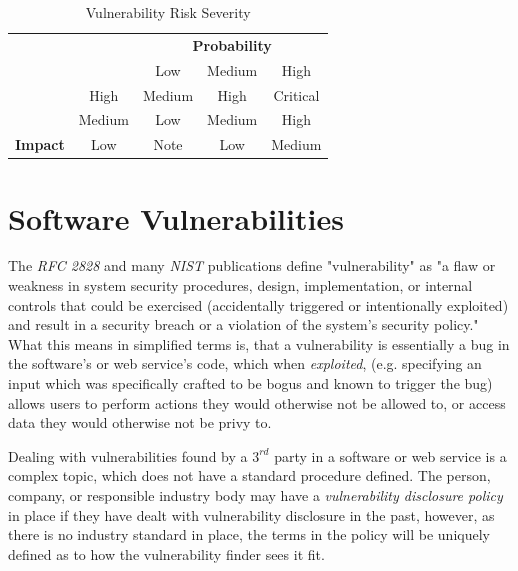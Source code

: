 \documentclass[a4paper,12pt]{article}
\begin{document}
	\begin{table}[!htbp]
		\centering
		\begin{tabular}{ccccc}
			\multicolumn{1}{l}{} & \multicolumn{1}{l}{} & \multicolumn{3}{c}{{\bf Probability}} \\
			\multicolumn{1}{l}{} &  & \cellcolor[HTML]{EFEFEF}Low & \cellcolor[HTML]{C0C0C0}Medium & \cellcolor[HTML]{9B9B9B}High \\
			& \cellcolor[HTML]{9B9B9B}High & \cellcolor[HTML]{F8A102}Medium & \cellcolor[HTML]{FE0000}High & \cellcolor[HTML]{FFCCC9}Critical \\
			& \cellcolor[HTML]{C0C0C0}Medium & \cellcolor[HTML]{FCFF2F}Low & \cellcolor[HTML]{F8A102}Medium & \cellcolor[HTML]{FE0000}High \\
			\multirow{-3}{*}{{\bf Impact}} & \cellcolor[HTML]{EFEFEF}Low & \cellcolor[HTML]{34FF34}Note & \cellcolor[HTML]{FCFF2F}Low & \cellcolor[HTML]{F8A102}Medium
		\end{tabular}
		\caption{Vulnerability Risk Severity}
		\label{vulnrisksever}
	\end{table}

\newpage
\section{Software Vulnerabilities}
	
	The \textit{RFC 2828} and many \textit{NIST} publications define "vulnerability" as "a flaw or weakness in system security procedures, design, implementation, or internal controls that could be exercised (accidentally triggered or intentionally exploited) and result in a security breach or a violation of the system's security policy."\cite{rfc2828,nist80030} What this means in simplified terms is, that a vulnerability is essentially a bug in the software's or web service's code, which when \textit{exploited}, (e.g. specifying an input which was specifically crafted to be bogus and known to trigger the bug) allows users to perform actions they would otherwise not be allowed to, or access data they would otherwise not be privy to.
	
	Dealing with vulnerabilities found by a $3^{rd}$ party in a software or web service is a complex topic, which does not have a standard procedure defined. The person, company, or responsible industry body may have a \textit{vulnerability disclosure policy} in place if they have dealt with vulnerability disclosure in the past, however, as there is no industry standard in place, the terms in the policy will be uniquely defined as to how the vulnerability finder sees it fit.
	
\end{document}
